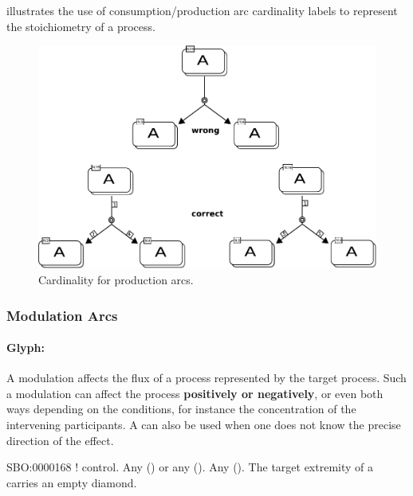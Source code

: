  illustrates the use of consumption/production arc cardinality labels to represent the stoichiometry of a process.

\begin{figure}[H]
  \centering
  \includegraphics[scale = 0.85]{examples/stoichEx1}
  \caption{Cardinality for production arcs.}
  \label{fig:prod-card}
\end{figure}

\subsubsection{Modulation Arcs}


\paragraph{Glyph: }\label{sec:modulation}

A modulation affects the flux of a process
represented by the target process. Such a modulation can affect the
process \textbf{positively or negatively}, or even both ways depending on the
conditions, for instance the concentration of the intervening
participants. A  can also be used when one does not know the precise direction of the effect.

\begin{glyphDescription}
 \glyphSboTerm SBO:0000168 ! control.
 \glyphOrigin Any  () or any  ().
 \glyphTarget Any  ().
 \glyphEndPoint The target extremity of a  carries an empty diamond.
 \end{glyphDescription}

